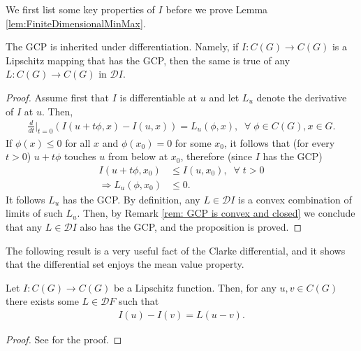\documentclass[11pt,reqno]{amsart}
\numberwithin{equation}{section}
\theoremstyle{plain}
\def\D{\mathcal D}
\begin{document}
We first list some key properties of $I$ before we prove Lemma \ref{lem:FiniteDimensionalMinMax}.

\begin{prop}\label{prop: global comparison property is inherited by the Clarke Jacobian}
  The GCP is inherited under differentiation. Namely, if $I:C(G)\to C(G)$ is a Lipschitz mapping that has the GCP, then the same is true of any $L:C(G)\to C(G)$ in $\D I$. 
 
\end{prop}

\begin{proof}  
  Assume first that $I$ is differentiable at $u$ and let $L_u$ denote the derivative of $I$ at $u$. Then,
  \begin{align*}
    \frac{d}{dt}|_{t=0}\left ( I(u+t\phi,x)-I(u,x)\right ) = L_u(\phi,x),\;\;\forall\;\phi\in C(G),x\in G.	  
  \end{align*}	   
  If $\phi(x)\leq 0$ for all $x$ and $\phi(x_0)=0$ for some $x_0$, it follows that (for every $t>0$) $u+t\phi$ touches $u$ from below at $x_0$, therefore (since $I$ has the GCP)
  \begin{align*}
     I(u+t\phi,x_0) & \leq I(u,x_0),\;\;\forall\;t>0\\
	 \Rightarrow L_u(\phi,x_0) & 	\leq 0.	  
  \end{align*}	  
  It follows $L_u$ has the GCP. By definition, any $L \in \mathcal{D}I$ is a convex combination of limits of such $L_u$. Then, by Remark \ref{rem: GCP is convex and closed} we conclude that any $L \in \mathcal{D}I$ also has the GCP, and the proposition is proved.  
  
\end{proof}

The following result is a very useful fact of the Clarke differential, and it shows that the differential set enjoys the mean value property.

\begin{prop}\label{prop: mean value theorem for Clarke's subdifferential}
  Let $I:C(G) \to C(G)$ be a Lipschitz function. Then, for any $u,v\in C(G)$ there exists some $L \in \mathcal{D}F$ such that
  \begin{align*}
    I(u)-I(v) = L(u-v).	  
  \end{align*}	  
\end{prop}

\begin{proof}
See \cite[Chapter 2, Proposition 2.6.5]{Cla1990optimization} for the proof.

\end{proof}
\end{document}
